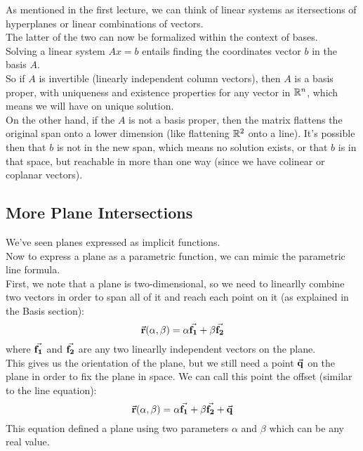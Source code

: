 \documentclass[12pt]{article}
\begin{document}
As mentioned in the first lecture,
we can think of linear systems as
itersections of hyperplanes or linear
combinations of vectors. \\
The latter of the two can now be formalized
within the context of bases. \\
Solving a linear system $Ax = b$ entails finding
the coordinates vector $b$
in the basis $A$. \\
So if $A$ is invertible (linearly independent
column vectors),
then $A$ is a basis proper, with uniqueness
and existence properties for any vector in $\mathbb{R}^n$,
which means we will have on unique solution. \\
On the other hand, if the $A$ is not a basis proper,
then the matrix flattens the original span
onto a lower dimension 
(like flattening $\mathbb{R}^2$ onto a line).
It's possible then that $b$ is not in the new
span, which means no solution exists,
or that $b$ is in that space, but reachable
in more than one way (since we have colinear
or coplanar vectors). \\

\newpage

\subsection*{More Plane Intersections}

We've seen planes expressed as implicit
functions. \\
Now to express a plane as a parametric function,
we can mimic the parametric line formula. \\
First, we note that a plane is two-dimensional,
so we need to linearlly combine two vectors
in order to span all of it
and reach each point on it
(as explained in the Basis section):
\[ \vec{\mathbf{r}}(\alpha, \beta) 
= \alpha \vec{\mathbf{f_1}} + \beta \vec{\mathbf{f_2}} \]
where $\vec{\mathbf{f_1}}$ and $\vec{\mathbf{f_2}}$
are any two linearlly independent vectors
on the plane. \\
This gives us the orientation of the plane,
but we still need a point $\vec{\mathbf{q}}$ on the plane
in order to fix the plane in space.
We can call this point the offset
(similar to the line equation):
\[ \vec{\mathbf{r}}(\alpha, \beta) 
= \alpha \vec{\mathbf{f_1}} + \beta \vec{\mathbf{f_2}} + \vec{\mathbf{q}} \]
This equation defined a plane using
two parameters $\alpha$ and $\beta$
which can be any real value. \\
\end{document}
